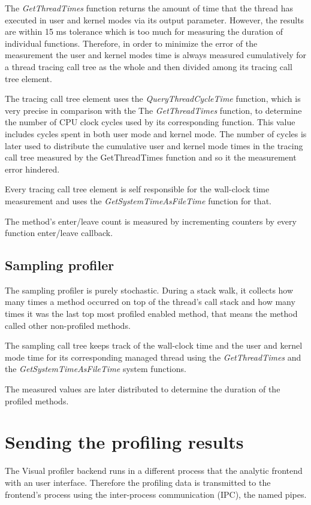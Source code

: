 The \textit{GetThreadTimes} function returns the amount of time that the thread has executed in user and kernel modes via its output parameter. However, the results are within 15 ms tolerance which is too much for measuring the duration of individual functions. Therefore, in order to minimize the error of the measurement the user and kernel modes time is always measured cumulatively for a thread tracing call tree as the whole and then divided among its tracing call tree element. 

The tracing call tree element uses the \textit{QueryThreadCycleTime} function, which is very precise in comparison with the The \textit{GetThreadTimes} function, to determine the number of CPU clock cycles used by its corresponding function. This value includes cycles spent in both user mode and kernel mode. The number of cycles is later used to distribute the cumulative user and kernel mode times in the tracing call tree measured by the GetThreadTimes function and so it the measurement error hindered.

Every tracing call tree element is self responsible for the wall-clock time measurement and uses the \textit{GetSystemTimeAsFileTime} function for that.

The method's enter/leave count is measured by incrementing counters by every function enter/leave callback.

\subsection{Sampling profiler}
The sampling profiler is purely stochastic. During a stack walk, it collects how many times a method occurred on top of the thread's call stack and how many times it was the last top most profiled enabled method, that means the method called other non-profiled methods.

The sampling call tree keeps track of the wall-clock time and the user and kernel mode time for its corresponding managed thread using the \textit{GetThreadTimes} and the \textit{GetSystemTimeAsFileTime} system functions.

The measured values are later distributed to determine the duration of the profiled methods.

\section{Sending the profiling results}
The Visual profiler backend runs in a different process that the analytic frontend with an user interface. Therefore the profiling data is transmitted to the frontend's process using the inter-process communication (IPC), the named pipes. 

